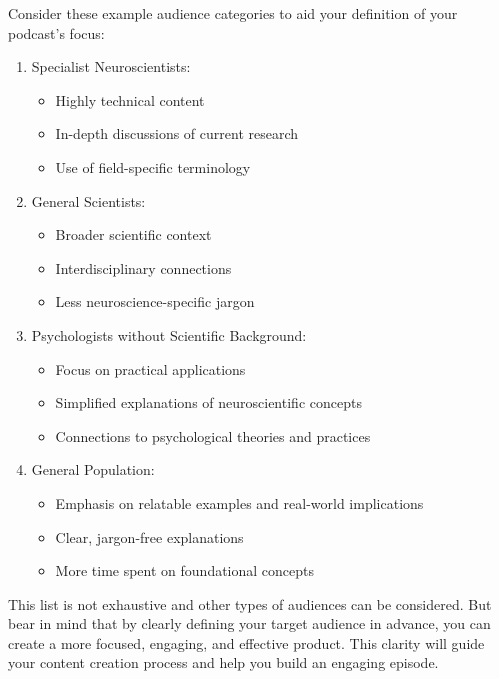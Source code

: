 \documentclass[
  letterpaper,
  DIV=11,
  numbers=noendperiod]{scrreprt}
\providecommand{\tightlist}{%
  \setlength{\itemsep}{0pt}\setlength{\parskip}{0pt}}\usepackage{longtable,booktabs,array}
\begin{document}
Consider these example audience categories to aid your definition of
your podcast's focus:

\begin{enumerate}
\def\labelenumi{\arabic{enumi}.}
\tightlist
\item
  Specialist Neuroscientists:

  \begin{itemize}
  \tightlist
  \item
    Highly technical content
  \item
    In-depth discussions of current research
  \item
    Use of field-specific terminology
  \end{itemize}
\item
  General Scientists:

  \begin{itemize}
  \tightlist
  \item
    Broader scientific context
  \item
    Interdisciplinary connections
  \item
    Less neuroscience-specific jargon
  \end{itemize}
\item
  Psychologists without Scientific Background:

  \begin{itemize}
  \tightlist
  \item
    Focus on practical applications
  \item
    Simplified explanations of neuroscientific concepts
  \item
    Connections to psychological theories and practices
  \end{itemize}
\item
  General Population:

  \begin{itemize}
  \tightlist
  \item
    Emphasis on relatable examples and real-world implications
  \item
    Clear, jargon-free explanations
  \item
    More time spent on foundational concepts
  \end{itemize}
\end{enumerate}

This list is not exhaustive and other types of audiences can be
considered. But bear in mind that by clearly defining your target
audience in advance, you can create a more focused, engaging, and
effective product. This clarity will guide your content creation process
and help you build an engaging episode.
\end{document}
